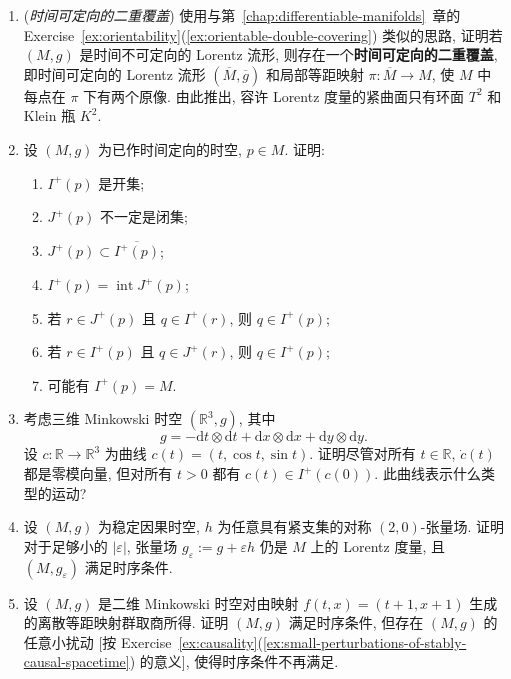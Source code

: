 \begin{RiemannExercise}\label{ex:causality}
\begin{enumerate}[label=(\arabic*),ref=\arabic*,leftmargin=*]
\item\label{ex:time-orientable-double-covering}
(\emph{时间可定向的二重覆盖}) 使用与第~\ref{chap:differentiable-manifolds}~章的 Exercise~\ref{ex:orientability}(\ref{ex:orientable-double-covering}) 类似的思路, 证明若 $(M,g)$ 是时间不可定向的 Lorentz 流形, 则存在一个\textbf{时间可定向的二重覆盖}, 即时间可定向的 Lorentz 流形 $(\overline M,\overline g)$ 和局部等距映射 $\pi:\overline M\to M$, 使 $M$ 中每点在 $\pi$ 下有两个原像. 由此推出, 容许 Lorentz 度量的紧曲面只有环面 $T^2$ 和 Klein 瓶 $K^2$.
\item\label{ex:properties-of-chronological-and-causal-futures}
设 $(M,g)$ 为已作时间定向的时空, $p\in M$. 证明:
\begin{enumerate}[label=(\alph*),leftmargin=*]
\item $I^+(p)$ 是开集;
\item $J^+(p)$ 不一定是闭集;
\item $J^+(p)\subset\overline{I^+(p)}$;
\item $I^+(p)=\operatorname{int}J^+(p)$;
\item 若 $r\in J^+(p)$ 且 $q\in I^+(r)$, 则 $q\in I^+(p)$;
\item 若 $r\in I^+(p)$ 且 $q\in J^+(r)$, 则 $q\in I^+(p)$;
\item 可能有 $I^+(p)=M$.
\end{enumerate}
\item\label{ex:null-helical-curve-in-minkowski-spacetime}
考虑三维 Minkowski 时空 $(\mathbb{R}^3,g)$, 其中
\[
  g=-\mathrm{d}t\otimes\mathrm{d}t+\mathrm{d}x\otimes\mathrm{d}x
    +\mathrm{d}y\otimes\mathrm{d}y.
\]
设 $c:\mathbb{R}\to\mathbb{R}^3$ 为曲线 $c(t)=(t,\cos t,\sin t)$. 证明尽管对所有 $t\in\mathbb{R}$, $\dot c(t)$ 都是零模向量, 但对所有 $t>0$ 都有 $c(t)\in I^+(c(0))$. 此曲线表示什么类型的运动?
\item\label{ex:small-perturbations-of-stably-causal-spacetime}
设 $(M,g)$ 为稳定因果时空, $h$ 为任意具有紧支集的对称 $(2,0)$-张量场. 证明对于足够小的 $|\varepsilon|$, 张量场 $g_\varepsilon:=g+\varepsilon h$ 仍是 $M$ 上的 Lorentz 度量, 且 $(M,g_\varepsilon)$ 满足时序条件.
\item\label{ex:chronological-but-not-stably-causal-quotient}
设 $(M,g)$ 是二维 Minkowski 时空对由映射 $f(t,x)=(t+1,x+1)$ 生成的离散等距映射群取商所得. 证明 $(M,g)$ 满足时序条件, 但存在 $(M,g)$ 的任意小扰动 [按 Exercise~\ref{ex:causality}(\ref{ex:small-perturbations-of-stably-causal-spacetime}) 的意义], 使得时序条件不再满足.

\end{enumerate}
\end{RiemannExercise}
